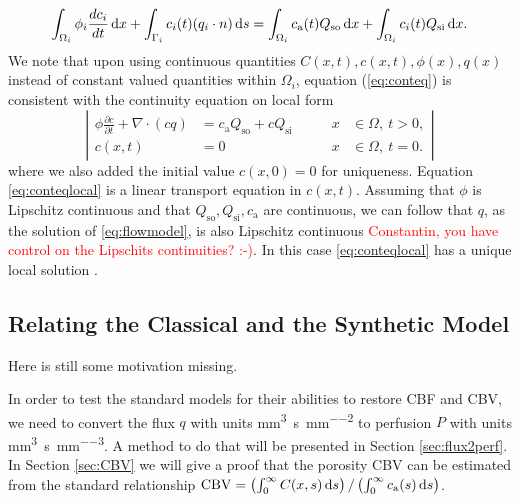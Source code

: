 \documentclass[paper=a4, fontsize=11pt,parskip=half,headings=small]{scrartcl}
\newcommand{\Qso}{Q_{\mathrm{so}}}
\newcommand{\Qsi}{Q_{\mathrm{si}}}
\newcommand{\ca}{c_\mathrm{a}}
\newcommand{\CBV}{\mathrm{CBV}}
\newcommand{\siQmm}{\milli\meter\cubed\per\second\per\milli\meter\cubed}
\newcommand{\siq}{\milli\meter\cubed\per\second\per\milli\meter\squared}
\begin{document}
	\begin{equation}
		\int_{\Omega_i} \phi_i \frac{d c_i}{dt} \diffint x + \int_{ \Gamma_i}c_i(t)(q_i \cdot n) \diffint s = \int_{\Omega_i}\ca(t)\Qso \diffint x + \int_{\Omega_i}c_i(t) \Qsi \diffint x.
		\label{eq:conteq}
	\end{equation}
	We note that upon using continuous quantities $C(x,t),c(x,t),\phi(x),q(x)$ instead of constant valued quantities within $\Omega_i$, equation (\ref{eq:conteq}) is consistent with the continuity equation on local form
	\begin{equation}
		\left\vert
		\begin{alignedat}{2}
			\phi \frac{\partial c}{\partial t} + \nabla \cdot (cq) &= \ca\Qso + c\Qsi \qquad	&x &\in \Omega, \ t>0,  \\
			c(x,t) &= 0 																			 	&x &\in \Omega, \ t=0.
		\end{alignedat}
		\right\vert
		\label{eq:conteqlocal}
	\end{equation}
	where we also added the initial value $c(x,0) = 0$ for uniqueness.
	Equation \eqref{eq:conteqlocal} is a linear transport equation in $c(x,t)$. 
	Assuming that $\phi$ is Lipschitz continuous and that $\Qso,\Qsi,\ca$ are continuous, we can follow that $q$, as the solution of \eqref{eq:flowmodel}, is also Lipschitz continuous \textcolor{red}{Constantin, you have control on the Lipschits continuities? :-)}.
	In this case \eqref{eq:conteqlocal} has a unique local solution \cite{evans98}.
	


	\subsection{Relating the Classical and the Synthetic Model}\label{sec:relation}
	Here is still some motivation missing.
	
	In order to test the standard models for their abilities to restore CBF and CBV, we need to convert the flux $q$ with units \si{\siq} to perfusion $P$ with units \si{\siQmm}. 
	A method to do that will be presented in Section \ref{sec:flux2perf}.
	In Section \ref{sec:CBV} we will give a proof that the porosity CBV can be estimated from the standard relationship $\CBV = \left(\int_0^\infty C(x,s) \diffint s\right)/\left(\int_0^\infty \ca(s) \diffint s\right)$.
	
\end{document}
